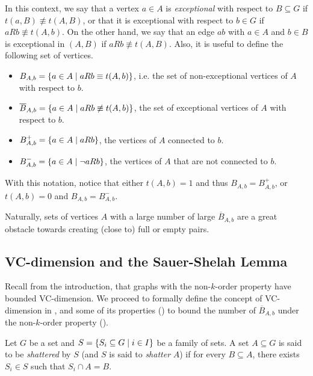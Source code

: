         In this context, we say that a vertex $a \in A$ is \emph{exceptional} with respect to $B \subseteq G$ if $t(a,B) \not\equiv t(A,B)$,
        or that it is exceptional with respect to $b \in G$ if $a R b \not\equiv t(A,b)$.
        On the other hand, we say that an edge $ab$ with $a \in A$ and $b \in B$ is exceptional in $(A,B)$ if $a R b \not\equiv t(A,B)$.
        Also, it is useful to define the following set of vertices.
        \begin{itemize}
            \item $B_{A,b} = \{ a \in A \mid a R b \equiv t(A,b) \}$, i.e. the set of non-exceptional vertices of $A$
                with respect to $b$.
            \item $\overline{B}_{A,b} = \{ a \in A \mid a R b \not\equiv t(A,b) \}$, the set of exceptional vertices of $A$ with
                respect to $b$.
            \item $B^+_{A,b} = \{ a \in A \mid a R b \}$, the vertices of $A$ connected to $b$.
            \item $B^-_{A,b} = \{ a \in A \mid \neg a R b \}$, the vertices of $A$ that are not connected to $b$.
        \end{itemize}
        With this notation, notice that either $t(A,b) = 1$ and thus $B_{A,b} = B^+_{A,b}$, or $t(A,b) = 0$ and $B_{A,b} = B^-_{A,b}$.

        Naturally, sets of vertices $A$ with a large number of large $\overline{B}_{A,b}$ are a great obstacle towards
        creating (close to) full or empty pairs.

    \subsection{VC-dimension and the Sauer-Shelah Lemma} \label{subsec:subsection_3.2}

        Recall from the introduction, that graphs with the non-$k$-order property have bounded VC-dimension.
        We proceed to formally define the concept of VC-dimension in , and some of its properties
        () to bound the number of $\overline{B}_{A,b}$
        under the non-$k$-order property ().

        \begin{definition} \label{def:shattered}
            Let $G$ be a set and $S = \{ S_i \subseteq G \mid i \in I \}$ be a family of sets.
            A set $A \subseteq G$ is said to be \emph{shattered} by $S$ (and $S$ is said to \emph{shatter} $A$) if
            for every $B \subseteq A$, there exists $S_i \in S$ such that $S_i \cap A = B$.
        \end{definition}

